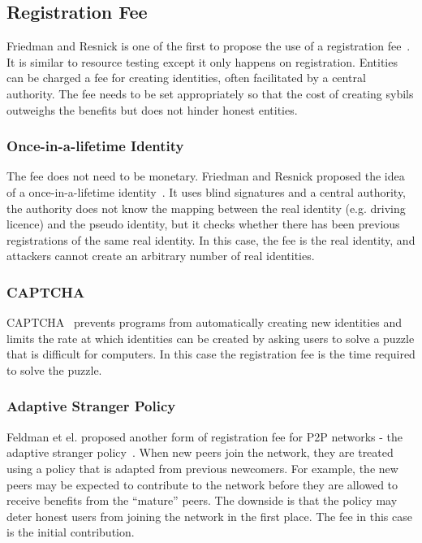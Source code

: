 
\subsection{Registration Fee}\label{sec:registration-fee}

Friedman and Resnick is one of the first to propose the use of a registration
fee~\cite{resnick2001social}. It is similar to resource testing except it only
happens on registration. Entities can be charged a fee for creating identities,
often facilitated by a central authority. The fee needs to be set appropriately
so that the cost of creating sybils outweighs the benefits but does not hinder
honest entities.

\subsubsection{Once-in-a-lifetime Identity}
The fee does not need to be monetary. Friedman and Resnick proposed the idea of
a once-in-a-lifetime identity~\cite{resnick2001social}. It uses blind signatures
and a central authority, the authority does not know the mapping between the
real identity (e.g. driving licence) and the pseudo identity, but it checks
whether there has been previous registrations of the same real identity. In this
case, the fee is the real identity, and attackers cannot create an arbitrary
number of real identities.

\subsubsection{CAPTCHA}
CAPTCHA~\cite{von2003captcha} prevents programs from automatically creating new
identities and limits the rate at which identities can be created by asking
users to solve a puzzle that is difficult for computers. In this case the
registration fee is the time required to solve the puzzle.

\subsubsection{Adaptive Stranger Policy}
Feldman et el. proposed another form of registration fee for P2P networks - the
adaptive stranger policy~\cite{feldman2004robust}. When new peers join the
network, they are treated using a policy that is adapted from previous
newcomers. For example, the new peers may be expected to contribute to the
network before they are allowed to receive benefits from the ``mature'' peers.
The downside is that the policy may deter honest users from joining the network
in the first place. The fee in this case is the initial contribution.


